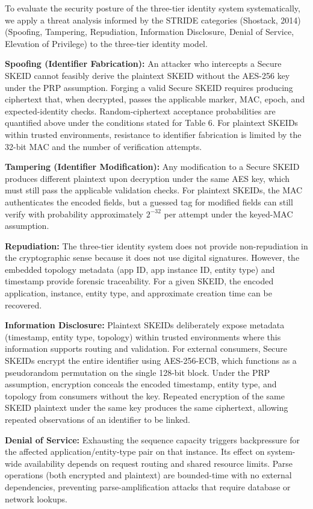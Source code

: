 \documentclass[fleqn,10pt,lineno]{wlpeerj}
\begin{document}
To evaluate the security posture of the three-tier identity system
systematically, we apply a threat analysis informed by the STRIDE
categories (Shostack, 2014) (Spoofing, Tampering, Repudiation,
Information Disclosure, Denial of Service, Elevation of Privilege) to
the three-tier identity model.

\textbf{Spoofing (Identifier Fabrication):} An attacker who intercepts a
Secure SKEID cannot feasibly derive the plaintext SKEID without the
AES-256 key under the PRP assumption. Forging a valid Secure SKEID
requires producing ciphertext that, when decrypted, passes the
applicable marker, MAC, epoch, and expected-identity checks.
Random-ciphertext acceptance probabilities are quantified above under
the conditions stated for Table 6. For plaintext SKEIDs within trusted
environments, resistance to identifier fabrication is limited by the
32-bit MAC and the number of verification attempts.

\textbf{Tampering (Identifier Modification):} Any modification to a
Secure SKEID produces different plaintext upon decryption under the same
AES key, which must still pass the applicable validation checks. For
plaintext SKEIDs, the MAC authenticates the encoded fields, but a
guessed tag for modified fields can still verify with probability
approximately \(2^{-32}\) per attempt under the keyed-MAC assumption.

\textbf{Repudiation:} The three-tier identity system does not provide
non-repudiation in the cryptographic sense because it does not use
digital signatures. However, the embedded topology metadata (app ID, app
instance ID, entity type) and timestamp provide forensic traceability.
For a given SKEID, the encoded application, instance, entity type, and
approximate creation time can be recovered.

\textbf{Information Disclosure:} Plaintext SKEIDs deliberately expose
metadata (timestamp, entity type, topology) within trusted environments
where this information supports routing and validation. For external
consumers, Secure SKEIDs encrypt the entire identifier using
AES-256-ECB, which functions as a pseudorandom permutation on the single
128-bit block. Under the PRP assumption, encryption conceals the encoded
timestamp, entity type, and topology from consumers without the key.
Repeated encryption of the same SKEID plaintext under the same key
produces the same ciphertext, allowing repeated observations of an
identifier to be linked.

\textbf{Denial of Service:} Exhausting the sequence capacity triggers
backpressure for the affected application/entity-type pair on that
instance. Its effect on system-wide availability depends on request
routing and shared resource limits. Parse operations (both encrypted and
plaintext) are bounded-time with no external dependencies, preventing
parse-amplification attacks that require database or network lookups.
\end{document}
